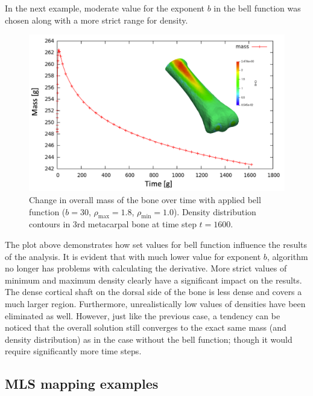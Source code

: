 \documentclass[11pt]{ACMEarticle}
\numberwithin{equation}{section}
\begin{document}
In the next example, moderate value for the exponent $b$ in the bell function was chosen along with a more strict range for density.
\begin{figure}[h!]
	\begin{centering}
		\includegraphics[width=15cm]{Figures/graphs/density_bell2}
		\caption{Change in overall mass of the bone over time with applied bell function ($b = 30$, $\rho_\mathrm{max} = 1.8$, $\rho_\mathrm{min} = 1.0$). Density distribution contours in 3rd metacarpal bone at time step $t=1600$.}
		\label{fig:density_bell2}
	\end{centering}
\end{figure}
The plot above demonstrates how set values for bell function influence the results of the analysis. It is evident that with much lower value for exponent $b$, algorithm no longer has problems with calculating the derivative. More strict values of minimum and maximum density clearly have a significant impact on the results. The dense cortical shaft on the dorsal side of the bone is less dense and covers a much larger region. Furthermore, unrealistically low values of densities have been eliminated as well. However, just like the previous case, a tendency can be noticed that the overall solution still converges to the exact same mass (and density distribution) as in the case without the bell function; though it would require significantly more time steps. \\
\subsection{MLS mapping examples}
\end{document}

